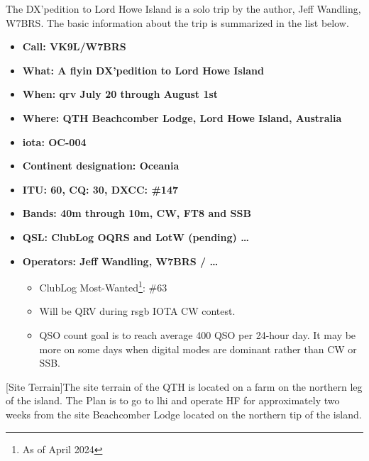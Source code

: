 \documentclass[11pt]{article}
\begin{document}
The DX'pedition to Lord Howe Island is a solo trip by the author, Jeff
Wandling, W7BRS.  The basic information about the trip is summarized
in the list below.

\begin{itemize}
\item {\textbf{Call: VK9L/W7BRS}}
\item {\textbf{What: A {\gls{flyin}} DX'pedition to Lord Howe Island}}
\item {\textbf{When: {\gls{qrv}} July 20 through August 1st}}
\item {\textbf{Where: QTH Beachcomber Lodge, Lord Howe Island, Australia}}
\item {\textbf{{\gls{iota}}: OC-004}}
\item {\textbf{Continent designation: Oceania}}
\item {\textbf{ITU: 60, CQ: 30, DXCC: \#147}}
\item {\textbf{Bands: 40m through 10m, CW, FT8 and SSB}}
\item {\textbf{QSL: ClubLog OQRS and LotW (pending)  \ldots}}
\item {\textbf{Operators: Jeff Wandling, W7BRS /  \ldots}}
\begin{itemize}
    \item ClubLog Most-Wanted\footnote{As of April 2024}: \#63
    \item Will be QRV during {\gls{rsgb}} IOTA CW contest.
    \item QSO count goal is to reach average 400 QSO per 24-hour day. It may
be more on some days when digital modes are dominant rather than CW or SSB.
\end{itemize}
\end{itemize}
\par

\vskip2mm
\noindent%
\begin{minipage}{\linewidth}%
\captionsetup{width=0.8\linewidth}
[Site Terrain]{The site terrain of the QTH is located
on a farm on the northern leg of the island.
The Plan is to go to {\gls{lhi}} and operate HF for approximately
two weeks from the site Beachcomber Lodge located on the northern
tip of the island.}
\label{farm}
\end{minipage}
\newpage
\vskip4mm
\end{document}
